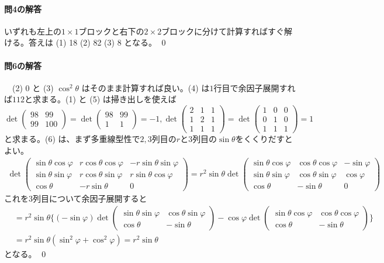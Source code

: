\paragraph{問4の解答} いずれも左上の$1\times 1$ブロックと右下の$2 \times 2$ブロックに分けて計算すればすぐ解ける。答えは (1) 18 (2) 82 (3) 8 となる。 \qed

\paragraph{問6の解答}　(2) 0 と (3) $\cos^2 \theta$ はそのまま計算すれば良い。(4) は$1$行目で余因子展開すれば$112$と求まる。(1) と (5) は掃き出しを使えば
\[
\det \begin{pmatrix}
98 & 99 \\
99 & 100
\end{pmatrix}
=
\det \begin{pmatrix}
98 & 99 \\
1 & 1
\end{pmatrix}
= -1, 
\det \begin{pmatrix}
2 & 1 & 1 \\
1 & 2 & 1 \\
1 & 1 & 1
\end{pmatrix}
=
\det \begin{pmatrix}
1 & 0 & 0 \\
0 & 1 & 0 \\
1 & 1 & 1
\end{pmatrix}
= 1
\]
と求まる。(6) は、まず多重線型性で$2, 3$列目の$r$と$3$列目の$\sin\theta$をくくりだすとよい。
\begin{align*}
\det \begin{pmatrix}
\sin\theta \cos\varphi & r \cos\theta \cos\varphi & -r\sin\theta\sin\varphi \\
\sin\theta \sin\varphi & r \cos\theta \sin\varphi & r\sin\theta\cos\varphi \\
\cos\theta & -r\sin\theta & 0
\end{pmatrix}
= r^2 \sin\theta
\det \begin{pmatrix}
\sin\theta \cos\varphi & \cos\theta \cos\varphi & -\sin\varphi \\
\sin\theta \sin\varphi & \cos\theta \sin\varphi & \cos\varphi \\
\cos\theta & -\sin\theta & 0
\end{pmatrix}
\end{align*}
これを$3$列目について余因子展開すると
\begin{align*}
&=
r^2 \sin\theta \biggl\{
(-\sin\varphi) \det
\begin{pmatrix}
\sin\theta \sin\varphi & \cos\theta \sin\varphi\\
\cos\theta & -\sin\theta
\end{pmatrix}
- \cos \varphi \det
\begin{pmatrix}
\sin\theta \cos\varphi & \cos\theta \cos\varphi \\
\cos\theta & -\sin\theta
\end{pmatrix}
\biggr\} \\
&= r^2\sin\theta (\sin^2 \varphi + \cos^2 \varphi)
= r^2\sin\theta
\end{align*}
となる。 \qed

